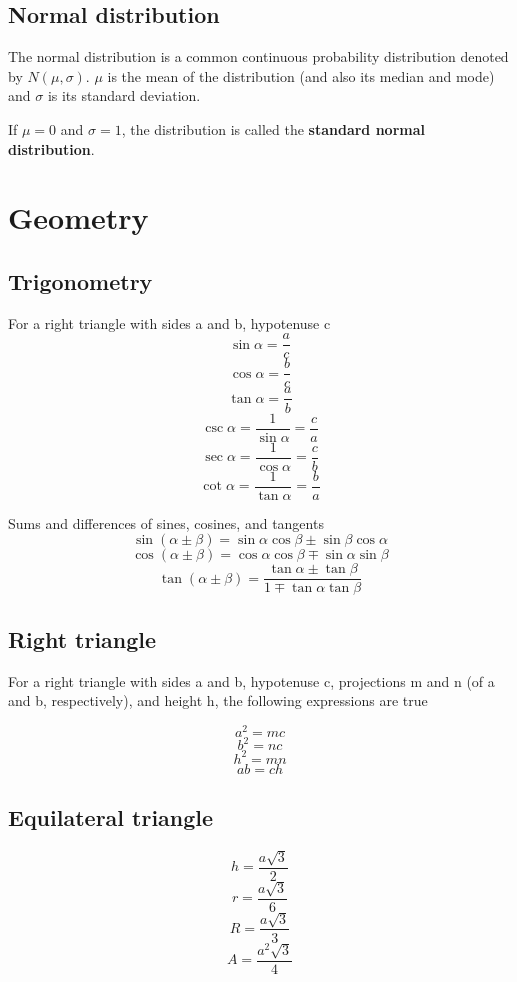 \documentclass[12pt, oneside]{book}
\newcommand*\reciprocal[1]{\frac{1}{#1}}
\begin{document}
\section{Normal distribution}
The normal distribution is a common continuous probability distribution denoted
by \(N(\mu, \sigma)\). \(\mu\) is the mean of the distribution (and also its
median and mode) and \(\sigma\) is its standard deviation.

If \(\mu = 0\) and \(\sigma = 1\), the distribution is called the
\textbf{standard normal distribution}.

\chapter{Geometry}

\section{Trigonometry}

For a right triangle with sides a and b, hypotenuse c
\[\sin{\alpha} = \frac{a}{c}\]
\[\cos{\alpha} = \frac{b}{c}\]
\[\tan{\alpha} = \frac{a}{b}\]
\[\csc{\alpha} = \reciprocal{\sin{\alpha}} = \frac{c}{a}\]
\[\sec{\alpha} = \reciprocal{\cos{\alpha}} = \frac{c}{b}\]
\[\cot{\alpha} = \reciprocal{\tan{\alpha}} = \frac{b}{a}\]

Sums and differences of sines, cosines, and tangents
\[{\sin{\left( \alpha \pm \beta \right)} =
  \sin{\alpha}\cos{\beta} \pm \sin{\beta}\cos{\alpha}}\]
\[{\cos{\left( \alpha \pm \beta \right)} =
  \cos{\alpha}\cos{\beta} \mp \sin{\alpha}\sin{\beta}}\]
\[{\tan{\left( \alpha \pm \beta \right)} =
  \frac{\tan{\alpha} \pm \tan{\beta}}{1 \mp \tan{\alpha} \tan{\beta}}}\]

\section{Right triangle}
For a right triangle with sides a and b, hypotenuse c, projections m and n (of
a and b, respectively), and height h,
the following expressions are true

\[a^2 = m c\]
\[b^2 = n c\]
\[h^2 = m n\]
\[a b = c h\]

\section{Equilateral triangle}
\[h = \frac{a \sqrt{3}}{2}\]
\[r = \frac{a \sqrt{3}}{6}\]
\[R = \frac{a \sqrt{3}}{3}\]
\[A = \frac{a^2 \sqrt{3}}{4}\]
\end{document}

